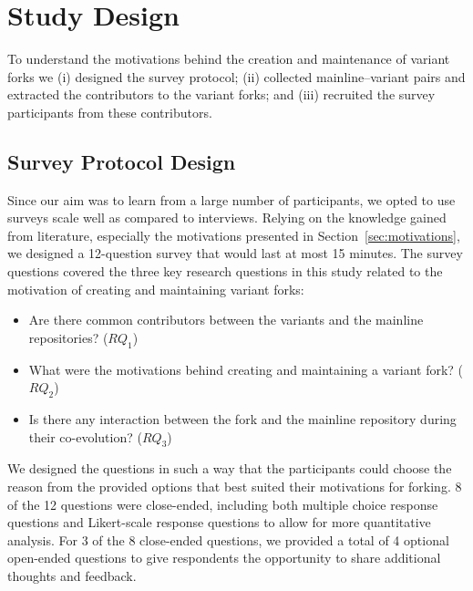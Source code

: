 \section{Study Design}
\label{sec:study_design}

To understand the motivations behind the creation and maintenance of variant forks we (i) designed the survey protocol; (ii) collected mainline--variant pairs and extracted the contributors to the variant forks; and (iii) recruited the survey participants from these contributors.


\subsection{Survey Protocol Design}
\label{sec:protocal}
Since our aim was to learn from a large number of participants, we opted to use surveys scale well as compared to interviews.
Relying on the knowledge gained from literature, especially the motivations  presented in Section~\ref{sec:motivations}, we designed a 12-question survey that would last at most 15 minutes. The survey questions covered the three key research questions in this study related to the motivation of creating and maintaining variant forks:

\begin{itemize}
\item Are there common contributors between the variants and the mainline repositories? ($RQ_1$)
\item What were the motivations behind creating and maintaining a variant fork? ($RQ_2$)
\item Is there any interaction between the fork and the mainline repository during their co-evolution? ($RQ_3$)
\end{itemize}

We designed the questions in such a way that the participants could choose the  reason from the provided options that best suited their motivations for forking. 8 of the 12 questions were close-ended, including both multiple choice response questions and Likert-scale response questions to allow for more quantitative analysis. For 3 of the 8 close-ended questions, we provided a total of 4 optional open-ended questions to give respondents the opportunity to share additional thoughts and feedback.


